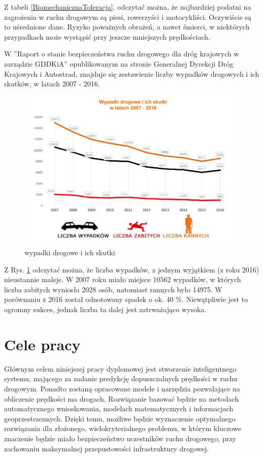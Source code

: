 Z tabeli \ref{BiomechanicznaToleracja}. odczytać można, że najbardziej podatni na zagrożenia w ruchu drogowym są piesi, rowerzyści i motocykliści. Oczywiście są to uśrednione dane. Ryzyko poważnych obrażeń, a nawet śmierci, w niektórych przypadkach może wystąpić przy jeszcze mniejszych prędkościach.

\newpage


W ''Raport o stanie bezpieczeństwa ruchu drogowego dla dróg krajowych w zarządzie GDDKiA'' opublikowanym na stronie Generalnej Dyrekcji Dróg Krajowych i Autostrad, znajduje się zestawienie liczby wypadków drogowych i ich skutków, w latach 2007 - 2016.

\begin{figure}[h]
\caption{wypadki drogowe i ich skutki}
\label{wypadkiSkutki}
\centering
\includegraphics[width=1.1\textwidth]{picture1}
\end{figure}

Z Rys. \ref{wypadkiSkutki} odczytać można, że liczba wypadków, z jednym wyjątkiem (z roku 2016) nieustannie maleje. W 2007 roku miało miejsce 10562 wypadków, w których liczba zabitych wyniosła 2028 osób, natomiast rannych było 14975. W porównaniu z 2016 został odnotowany spadek o ok. 40 \%. Niewątpliwie jest to ogromny sukces, jednak liczba ta dalej jest zatrważająco wysoka. 

\newpage
\section{Cele pracy}
\label{sec:celePracy}

Głównym celem niniejszej pracy dyplomowej jest stworzenie inteligentnego systemu, mającego za zadanie predykcję dopuszczalnych prędkości w ruchu drogowym. Ponadto zostaną opracowane modele i narzędzia pozwalające na obliczenie prędkości ma drogach. Rozwiązanie bazować będzie na metodach automatycznego wnioskowania, modelach matematycznych i informacjach geoprzestrzennych. Dzięki temu, możliwe będzie wyznaczenie optymalnego rozwiązania dla złożonego, wielokryterialnego problemu, w którym kluczowe znaczenie będzie miało bezpieczeństwo uczestników ruchu drogowego, przy zachowaniu maksymalnej przepustowości infrastruktury drogowej.

